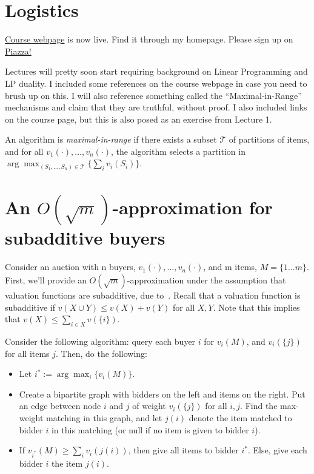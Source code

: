 

\usepackage{hyperref}


\disclaimer
\section{Logistics}
\href{https://www.cs.princeton.edu/~smattw/Teaching/cos597Ffa18.htm}{Course webpage} is now live. Find it through my homepage. Please sign up on \href{https://piazza.com/class/jlxxavpqz85n2}{Piazza!}

Lectures will pretty soon start requiring background on Linear Programming and LP duality. I included some references on the course webpage in case you need to brush up on this. I will also reference something called the ``Maximal-in-Range'' mechanisms and claim that they are truthful, without proof. I also included links on the course page, but this is also posed as an exercise from Lecture 1.

\begin{definition} An algorithm is \emph{maximal-in-range} if there exists a subset $\mathcal{T}$ of partitions of items, and for all $v_1(\cdot),\ldots, v_n(\cdot)$, the algorithm selects a partition in $\arg\max_{(S_1,\ldots, S_n) \in \mathcal{T}} \{\sum_i v_i(S_i)\}$.
\end{definition}

\section{An $O(\sqrt{m})$-approximation for subadditive buyers}
Consider an auction with n buyers, $v_1(\cdot),\ldots, v_n(\cdot)$, and m items, $M = \{ 1 \ldots m\}$. First, we'll provide an $O(\sqrt{m})$-approximation under the assumption that valuation functions are subadditive, due to~\cite{DobzinskiNS05}. Recall that a valuation function is subadditive if $v(X \cup Y) \leq v(X) + v(Y)$ for all $X, Y$. Note that this implies that $v(X) \leq \sum_{i \in X} v(\{i\})$.

Consider the following algorithm: query each buyer $i$ for $v_i(M)$, and $v_i(\{j\})$ for all items $j$. Then, do the following:
\begin{itemize}
\item Let $i^*:= \arg\max_i \{v_i(M)\}$.
\item Create a bipartite graph with bidders on the left and items on the right. Put an edge between node $i$ and $j$ of weight $v_i(\{j\})$ for all $i, j$. Find the max-weight matching in this graph, and let $j(i)$ denote the item matched to bidder $i$ in this matching (or null if no item is given to bidder $i$).
\item If $v_{i^*}(M) \geq \sum_i v_i(j(i))$, then give all items to bidder $i^*$. Else, give each bidder $i$ the item $j(i)$.
\end{itemize}

